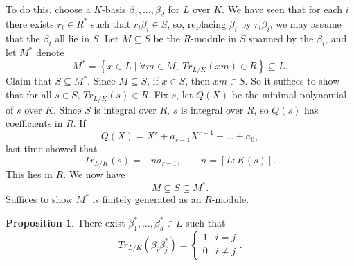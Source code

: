 \documentclass{article}
\newcommand{\rb}[1]{\left( #1 \right)}
\renewcommand{\sb}[1]{\left[ #1 \right]}
\newcommand{\cb}[1]{\left\{ #1 \right\}}
\theoremstyle{definition}\newtheorem{definition}{Definition}[subsection]
\theoremstyle{definition}\newtheorem{remark}[definition]{Remark}
\theoremstyle{definition}\newtheorem*{example}{Example}
\theoremstyle{definition}\newtheorem*{note}{Note}
\newtheorem{proposition}[definition]{Proposition}
\begin{document}
To do this, choose a $ K $-basis $ \beta_1, \dots, \beta_d $ for $ L $ over $ K $. We have seen that for each $ i $ there exists $ r_i \in R^* $ such that $ r_i\beta_i \in S $, so, replacing $ \beta_i $ by $ r_i\beta_i $, we may assume that the $ \beta_i $ all lie in $ S $. Let $ M \subseteq S $ be the $ R $-module in $ S $ spanned by the $ \beta_i $, and let $ M^* $ denote
$$ M^* = \cb{x \in L \mid \forall m \in M, \ Tr_{L / K}\rb{xm} \in R} \subseteq L. $$
Claim that $ S \subseteq M^* $. Since $ M \subseteq S $, if $ x \in S $, then $ xm \in S $. So it suffices to show that for all $ s \in S $, $ Tr_{L / K}\rb{s} \in R $. Fix $ s $, let $ Q\rb{X} $ be the minimal polynomial of $ s $ over $ K $. Since $ S $ is integral over $ R $, $ s $ is integral over $ R $, so $ Q\rb{s} $ has coefficients in $ R $. If
$$ Q\rb{X} = X^r + a_{r - 1}X^{r - 1} + \dots + a_0, $$
last time showed that
$$ Tr_{L / K}\rb{s} = -na_{r - 1}, \qquad n = \sb{L : K\rb{s}}. $$
This lies in $ R $. We now have
$$ M \subseteq S \subseteq M^*. $$
Suffices to show $ M^* $ is finitely generated as an $ R $-module.

\begin{proposition}
There exist $ \beta_1^*, \dots, \beta_d^* \in L $ such that
$$ Tr_{L / K}\rb{\beta_i\beta_j^*} = \begin{cases} 1 & i = j \\ 0 & i \ne j \end{cases}. $$
\end{proposition}
\end{document}
